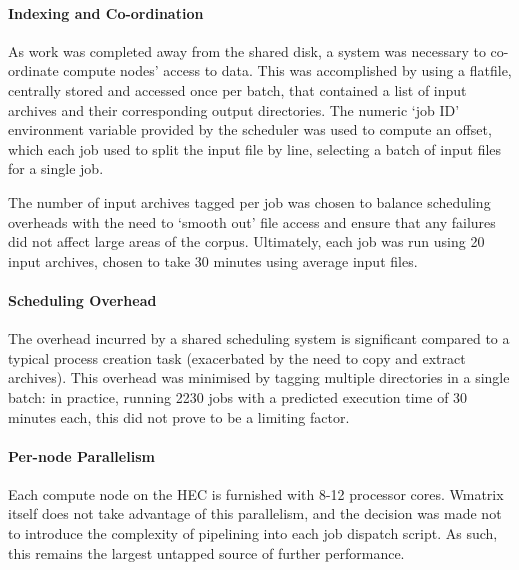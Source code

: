 
\paragraph{Indexing and Co-ordination}
As work was completed away from the shared disk, a system was necessary to co-ordinate compute nodes' access to data.
This was accomplished by using a flatfile, centrally stored and accessed once per batch, that contained a list of input archives and their corresponding output directories.  
The numeric `job ID' environment variable provided by the scheduler was used to compute an offset, which each job used to split the input file by line, selecting a batch of input files for a single job.

The number of input archives tagged per job was chosen to balance scheduling overheads with the need to `smooth out' file access and ensure that any failures did not affect large areas of the corpus.  Ultimately, each job was run using 20 input archives, chosen to take 30 minutes using average input files.



\paragraph{Scheduling Overhead}
The overhead incurred by a shared scheduling system is significant compared to a typical process creation task (exacerbated by the need to copy and extract archives).  This overhead was minimised by tagging multiple directories in a single batch: in practice, running 2230 jobs with a predicted execution time of 30 minutes each, this did not prove to be a limiting factor.


\paragraph{Per-node Parallelism}
Each compute node on the HEC is furnished with 8-12 processor cores.  Wmatrix itself does not take advantage of this parallelism, and the decision was made not to introduce the complexity of pipelining into each job dispatch script. 
As such, this remains the largest untapped source of further performance.



